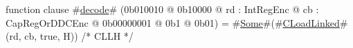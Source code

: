 function clause #\hyperref[sailMIPSzdecode]{decode}# (0b010010 @ 0b10000 @ rd : IntRegEnc @ cb : CapRegOrDDCEnc @ 0b00000001 @ 0b1 @ 0b01) = #\hyperref[sailMIPSzSome]{Some}#(#\hyperref[sailMIPSzCLoadLinked]{CLoadLinked}#(rd, cb, true,  H)) /* CLLH  */
